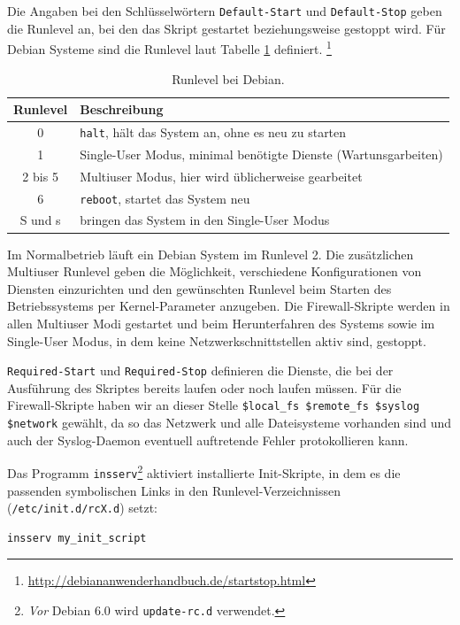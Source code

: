 Die Angaben bei den Schlüsselwörtern {\tt Default-Start} und {\tt Default-Stop}
geben die Runlevel an, bei den das Skript gestartet beziehungsweise gestoppt
wird.
Für Debian Systeme sind die Runlevel laut Tabelle \ref{tab.runlevel} definiert.
\footnote{
\url{http://debiananwenderhandbuch.de/startstop.html}
}

\begin{table}[htb]
    \centering
    \begin{tabular}{|c|l|}
        \hline
        Runlevel & Beschreibung\\
        \hline
        0       & {\tt halt}, hält das System an, ohne es neu zu starten\\
        1       & Single-User Modus, minimal benötigte Dienste (Wartunsgarbeiten)\\
        2 bis 5 & Multiuser Modus, hier wird üblicherweise gearbeitet\\
        6       & {\tt reboot}, startet das System neu\\
        S und s & bringen das System in den Single-User Modus\\
        \hline
    \end{tabular}
   \caption{Runlevel bei Debian.}\label{tab.runlevel}
\end{table}

\noindent Im Normalbetrieb läuft ein Debian System im Runlevel 2.
Die zusätzlichen Multiuser Runlevel geben die Möglichkeit, verschiedene
Konfigurationen von Diensten einzurichten und den gewünschten Runlevel beim
Starten des Betriebssystems per Kernel-Parameter anzugeben.
Die Firewall-Skripte werden in allen Multiuser Modi gestartet und beim
Herunterfahren des Systems sowie im Single-User Modus, in dem keine
Netzwerkschnittstellen aktiv sind, gestoppt.

{\tt Required-Start} und {\tt Required-Stop} definieren die Dienste, die bei
der Aus\-füh\-rung des Skriptes bereits laufen oder noch laufen müssen.
Für die Firewall-Skripte haben wir an dieser Stelle
\verb!$local_fs $remote_fs $syslog $network! gewählt, da so das Netzwerk und
alle Dateisysteme vorhanden sind und auch der Syslog-Daemon eventuell
auftretende Fehler protokollieren kann.

Das Programm {\tt insserv}\footnote{
\emph{Vor} Debian 6.0 wird {\tt update-rc.d} verwendet.
} aktiviert installierte Init-Skripte, in dem es die passenden symbolischen
Links in den Runlevel-Verzeichnissen ({\tt /etc/init.d/rcX.d}) setzt:

\begin{verbatim}
insserv my_init_script
\end{verbatim}


